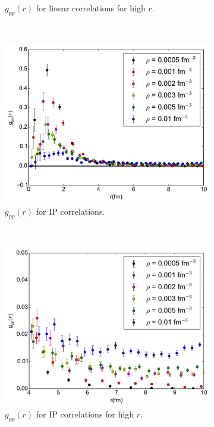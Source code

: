 \documentclass[12pt]{article}
\begin{document}
\begin{figure}[h!]
\begin{subfigure}{0.49\textwidth}
      \caption{$g_{pp}(r)$ for linear correlations for high $r$.}
   \end{subfigure}
   ~
   \begin{subfigure}{0.49\textwidth}
      \includegraphics[width=\textwidth]{../gpp_ip.pdf}
      \caption{$g_{pp}(r)$ for IP correlations.}
   \end{subfigure}
   ~
   \begin{subfigure}{0.49\textwidth}
      \includegraphics[width=\textwidth]{../gpp_ip_small.pdf}
      \caption{$g_{pp}(r)$ for IP correlations for high $r$.}
   \end{subfigure}
   ~
   \begin{subfigure}{0.49\textwidth}

\end{subfigure}
\end{figure}
\end{document}
